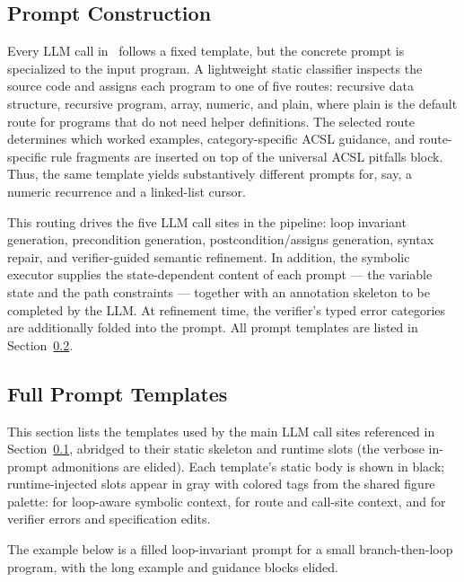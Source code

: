 \subsection{Prompt Construction}
\label{sec:prompt}

\noindent
Every LLM call in \toolname\ follows a fixed template, but the concrete prompt is specialized to the input program. A lightweight static classifier inspects the source code and assigns each program to one of five routes: recursive data structure, recursive program, array, numeric, and plain, where plain is the default route for programs that do not need helper definitions. The selected route determines which worked examples, category-specific ACSL guidance, and route-specific rule fragments are inserted on top of the universal ACSL pitfalls block. Thus, the same template yields substantively different prompts for, say, a numeric recurrence and a linked-list cursor.

This routing drives the five LLM call sites in the pipeline: loop invariant generation, precondition generation, postcondition/assigns generation, syntax repair, and verifier-guided semantic refinement. In addition, the symbolic executor supplies the state-dependent content of each prompt --- the variable state and the path constraints --- together with an annotation skeleton to be completed by the LLM. At refinement time, the verifier's typed error categories are additionally folded into the prompt. All prompt templates are listed in {Section~\ref{app:prompts}}.

\subsection{Full Prompt Templates}
\label{app:prompts}

This section lists the templates used by the main LLM call sites referenced in Section~\ref{sec:prompt}, abridged to their static skeleton and runtime slots (the verbose in-prompt admonitions are elided). Each template's static body is shown in black; runtime-injected slots appear in gray with colored tags from the shared figure palette:  for loop-aware symbolic context,  for route and call-site context, and  for verifier errors and specification edits.



The example below is a filled loop-invariant prompt for a small branch-then-loop program, with the long example and guidance blocks elided.


